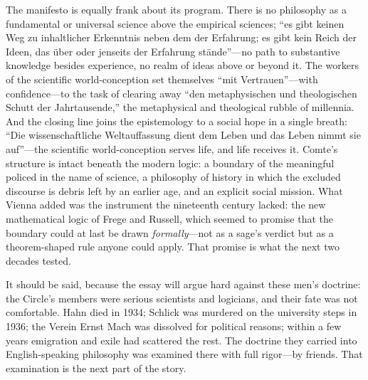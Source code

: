 The manifesto is equally frank about its program. There is no philosophy as a fundamental or universal science above the empirical sciences; ``es gibt keinen Weg zu inhaltlicher Erkenntnis neben dem der Erfahrung; es gibt kein Reich der Ideen, das \"uber oder jenseits der Erfahrung st\"ande''---no path to substantive knowledge besides experience, no realm of ideas above or beyond it. The workers of the scientific world-conception set themselves ``mit Vertrauen''---with confidence---to the task of clearing away ``den metaphysischen und theologischen Schutt der Jahrtausende,'' the metaphysical and theological rubble of millennia. And the closing line joins the epistemology to a social hope in a single breath: ``Die wissenschaftliche Weltauffassung dient dem Leben und das Leben nimmt sie auf''---the scientific world-conception serves life, and life receives it. Comte's structure is intact beneath the modern logic: a boundary of the meaningful policed in the name of science, a philosophy of history in which the excluded discourse is debris left by an earlier age, and an explicit social mission. What Vienna added was the instrument the nineteenth century lacked: the new mathematical logic of Frege and Russell, which seemed to promise that the boundary could at last be drawn \emph{formally}---not as a sage's verdict but as a theorem-shaped rule anyone could apply. That promise is what the next two decades tested.

It should be said, because the essay will argue hard against these men's doctrine: the Circle's members were serious scientists and logicians, and their fate was not comfortable. Hahn died in 1934; Schlick was murdered on the university steps in 1936; the Verein Ernst Mach was dissolved for political reasons; within a few years emigration and exile had scattered the rest. The doctrine they carried into English-speaking philosophy was examined there with full rigor---by friends. That examination is the next part of the story.

